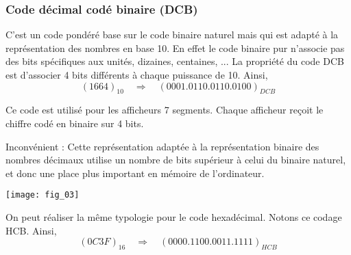 \vspace{.25cm}

\subsubsection{Code décimal codé binaire (DCB)}
C'est un code pondéré base sur le code binaire naturel mais qui est adapté à la représentation des nombres en base 10. En effet le code binaire pur n'associe pas des bits spécifiques aux unités, dizaines, centaines, ... La propriété du code DCB est d'associer 4 bits différents à chaque puissance de 10. Ainsi, 
$$
(1664)_{10} \quad \Longrightarrow \quad  (0001.0110.0110.0100)_{DCB}
$$

Ce code est utilisé pour les afficheurs 7 segments. Chaque afficheur reçoit le chiffre codé en binaire sur 4 bits. 

\begin{minipage}[c]{.6\linewidth}
Inconvénient : Cette représentation adaptée à la représentation binaire des nombres décimaux utilise un nombre de bits supérieur à celui du binaire naturel, et donc une place plus important en mémoire de l'ordinateur. 
\end{minipage} \hfill
\begin{minipage}[c]{.25\linewidth}
\begin{center}
\texttt{[image: fig\_03]}
\end{center}
\end{minipage}

\begin{rem}
On peut réaliser la même typologie pour le code hexadécimal. Notons ce codage HCB. Ainsi,
$$
(0C3F)_{16} \quad \Longrightarrow \quad (0000.1100.0011.1111)_{HCB}
$$
\end{rem}

